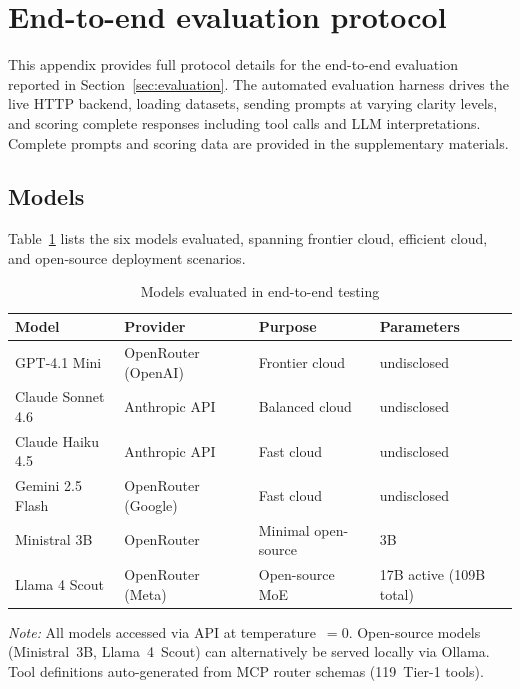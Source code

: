 
\section{End-to-end evaluation protocol} \label{app:e2e-eval}
\setcounter{table}{0}
\setcounter{figure}{0}

This appendix provides full protocol details for the end-to-end evaluation
reported in Section~\ref{sec:evaluation}.  The automated evaluation harness
drives the live  HTTP backend, loading datasets,
sending prompts at varying clarity levels, and scoring complete responses
including tool calls and LLM interpretations.  Complete prompts and scoring
data are provided in the supplementary materials.

\subsection{Models}

Table~\ref{tab:e2e-models} lists the six models evaluated, spanning
frontier cloud, efficient cloud, and open-source deployment scenarios.

\begin{table}[htbp]
\centering
\begin{threeparttable}
\caption{Models evaluated in end-to-end testing}
\label{tab:e2e-models}
\small
\begin{tabular}{llll}
\toprule
Model & Provider & Purpose & Parameters \\
\midrule
GPT-4.1 Mini      & OpenRouter (OpenAI) & Frontier cloud   & undisclosed \\
Claude Sonnet 4.6 & Anthropic API & Balanced cloud         & undisclosed \\
Claude Haiku 4.5  & Anthropic API & Fast cloud             & undisclosed \\
Gemini 2.5 Flash  & OpenRouter (Google) & Fast cloud        & undisclosed \\
Ministral 3B      & OpenRouter    & Minimal open-source    & 3B \\
Llama 4 Scout     & OpenRouter (Meta) & Open-source MoE    & 17B active (109B total) \\
\bottomrule
\end{tabular}
\begin{tablenotes}[flushleft]
\item \emph{Note:} All models accessed via API at temperature~$=0$.
Open-source models (Ministral~3B, Llama~4~Scout) can alternatively be
served locally via Ollama.  Tool definitions auto-generated from MCP
router schemas (119~Tier-1 tools).
\end{tablenotes}
\end{threeparttable}
\end{table}

